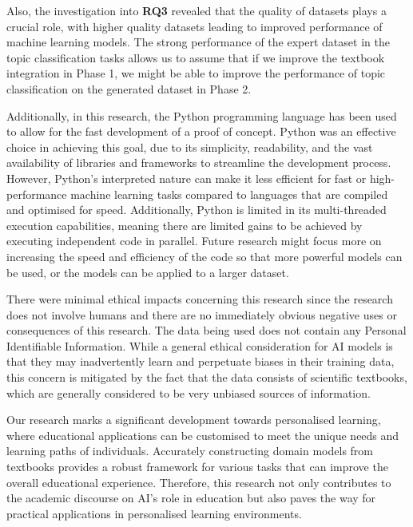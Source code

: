 \documentclass[twocolumn]{article}
\begin{document}
Also, the investigation into \textbf{RQ3} revealed that the quality of datasets plays a crucial role, with higher quality datasets leading to improved performance of machine learning models. The strong performance of the expert dataset in the topic classification tasks allows us to assume that if we improve the textbook integration in Phase 1, we might be able to improve the performance of topic classification on the generated dataset in Phase 2.

Additionally, in this research, the Python programming language has been used to allow for the fast development of a proof of concept. Python was an effective choice in achieving this goal, due to its simplicity, readability, and the vast availability of libraries and frameworks to streamline the development process. 
However, Python's interpreted nature can make it less efficient for fast or high-performance machine learning tasks compared to languages that are compiled and optimised for speed. Additionally, Python is limited in its multi-threaded execution capabilities, meaning there are limited gains to be achieved by executing independent code in parallel. Future research might focus more on increasing the speed and efficiency of the code so that more powerful models can be used, or the models can be applied to a larger dataset.

There were minimal ethical impacts concerning this research since the research does not involve humans and there are no immediately obvious negative uses or consequences of this research. The data being used does not contain any Personal Identifiable Information. While a general ethical consideration for AI models is that they may inadvertently learn and perpetuate biases in their training data, this concern is mitigated by the fact that the data consists of scientific textbooks, which are generally considered to be very unbiased sources of information.

Our research marks a significant development towards personalised learning, where educational applications can be customised to meet the unique needs and learning paths of individuals. Accurately constructing domain models from textbooks provides a robust framework for various tasks that can improve the overall educational experience. Therefore, this research not only contributes to the academic discourse on AI's role in education but also paves the way for practical applications in personalised learning environments.
\end{document}
